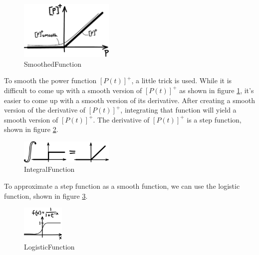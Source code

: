 \begin{figure}[h]		%
\begin{centering}
\includegraphics[width=0.4\textwidth]{Figures/SmoothedFunction}\par
\end{centering}
\caption{SmoothedFunction}
\label{fig:SmoothedFunction}
\end{figure}
%

To smooth the power function $[P(t)]^{+}$, a little trick is used. While it is difficult to come up with a smooth version of $[P(t)]^{+}$ as shown in figure \ref{fig:SmoothedFunction}, it's easier to come up with a smooth version of its derivative. After creating a smooth version of the derivative of $[P(t)]^{+}$, integrating that function will yield a smooth version of $[P(t)]^{+}$. The derivative of $[P(t)]^{+}$ is a step function, shown in figure \ref{fig:IntegralFunction}.

\begin{figure}[h]		%
\begin{centering}
\includegraphics[width=0.4\textwidth]{Figures/IntegralFunction}\par
\end{centering}
\caption{IntegralFunction}
\label{fig:IntegralFunction}
\end{figure}
%

To approximate a step function as a smooth function, we can use the logistic function, shown in figure \ref{fig:LogisticFunction}.

\begin{figure}[h]		%
\begin{centering}
\includegraphics[width=0.18\textwidth]{Figures/LogisticFunction}\par
\end{centering}
\caption{LogisticFunction}
\label{fig:LogisticFunction}
\end{figure}
%

